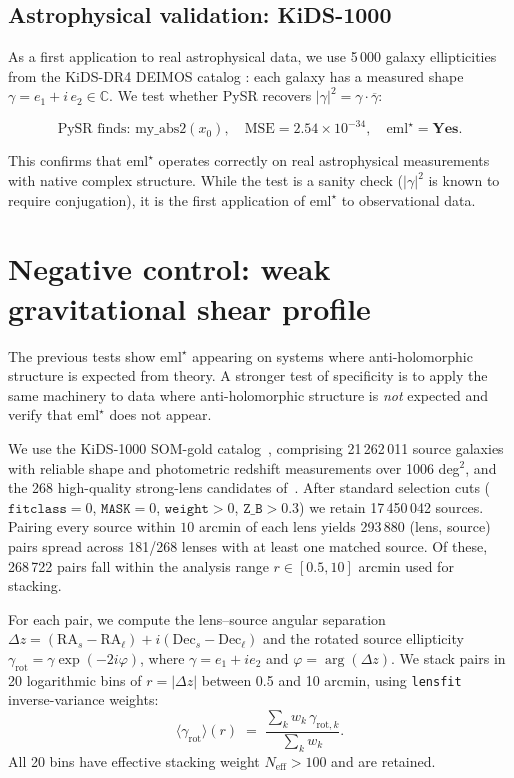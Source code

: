 \documentclass[12pt,a4paper]{article}
\newcommand{\emlstar}{\mathrm{eml}^{\star}}
\newcommand{\conj}[1]{\overline{#1}}
\begin{document}
\subsection{Astrophysical validation: KiDS-1000}
\label{sec:kids}

As a first application to real astrophysical data, we use 5\,000
galaxy ellipticities from the KiDS-DR4 DEIMOS catalog
\citep{giblin2021kids1000}: each galaxy has a measured shape
$\gamma = e_1 + i\,e_2 \in \mathbb{C}$.
We test whether PySR recovers $|\gamma|^2 = \gamma \cdot \conj{\gamma}$:

\begin{equation}
\text{PySR finds: } \mathrm{my\_abs2}(x_0), \quad
\mathrm{MSE} = 2.54 \times 10^{-34}, \quad \emlstar = \textbf{Yes}.
\end{equation}

This confirms that $\emlstar$ operates correctly on real
astrophysical measurements with native complex structure.
While the test is a sanity check ($|\gamma|^2$ is known to
require conjugation), it is the first application of $\emlstar$
to observational data.


\section{Negative control: weak gravitational shear profile}
\label{sec:lensing-control}

The previous tests show $\emlstar$ appearing on systems where
anti-holomorphic structure is expected from theory.
A stronger test of specificity is to apply the same machinery to
data where anti-holomorphic structure is \emph{not} expected and
verify that $\emlstar$ does not appear.

We use the KiDS-1000 SOM-gold catalog~\citep{giblin2021kids1000}, comprising
21\,262\,011 source galaxies with reliable shape and photometric
redshift measurements over 1006 deg$^2$, and the 268 high-quality
strong-lens candidates of~\citet{petrillo2019linKS, li2020kids, li2021kids}.
After standard selection cuts
($\mathtt{fitclass}=0$, $\mathtt{MASK}=0$, $\mathtt{weight}>0$,
$\mathtt{Z\_B}>0.3$) we retain 17\,450\,042 sources.
Pairing every source within $10$ arcmin of each lens yields
293\,880 (lens, source) pairs spread across 181/268 lenses
with at least one matched source. Of these, 268\,722 pairs fall within the analysis range $r \in [0.5, 10]$ arcmin used for stacking.

For each pair, we compute the lens--source angular separation
$\Delta z = (\mathrm{RA}_s - \mathrm{RA}_\ell) + i(\mathrm{Dec}_s - \mathrm{Dec}_\ell)$
and the rotated source ellipticity
$\gamma_\mathrm{rot} = \gamma \exp(-2i\varphi)$,
where $\gamma = e_1 + ie_2$ and $\varphi = \arg(\Delta z)$.
We stack pairs in 20 logarithmic bins of $r = |\Delta z|$
between 0.5 and 10 arcmin, using \texttt{lensfit} inverse-variance
weights:
\begin{equation}
\langle\gamma_\mathrm{rot}\rangle(r)
\;=\;
\frac{\sum_k w_k\,\gamma_{\mathrm{rot},k}}{\sum_k w_k}.
\label{eq:stacking}
\end{equation}
All 20 bins have effective stacking weight $N_\mathrm{eff} > 100$
and are retained.
\end{document}
